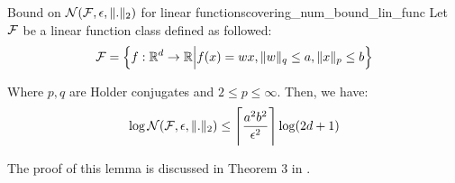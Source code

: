\begin{lemma}{Bound on $\mathcal{N}(\mathcal{F}, \epsilon, \|.\|_2)$ for linear functions}{covering_num_bound_lin_func}
    Let $\mathcal{F}$ be a linear function class defined as followed:
    \begin{align*}
        \mathcal{F} = \Big\{ 
            f:\mathbb{R}^d\to\mathbb{R} \Big| f(x) = wx, \|w\|_q \le a, \|x\|_p \le b
         \Big\}
    \end{align*}

    \noindent Where $p, q$ are Holder conjugates and $2\le p\le \infty$. Then, we have:
    \begin{align*}
        \log\mathcal{N}(\mathcal{F}, \epsilon, \|.\|_2) \le \Bigg\lceil \frac{a^2b^2}{\epsilon^2} \Bigg\rceil \log(2d+1)
    \end{align*}

    \noindent The proof of this lemma is discussed in Theorem 3 in \cite{article:tong_zhang}.
\end{lemma}
